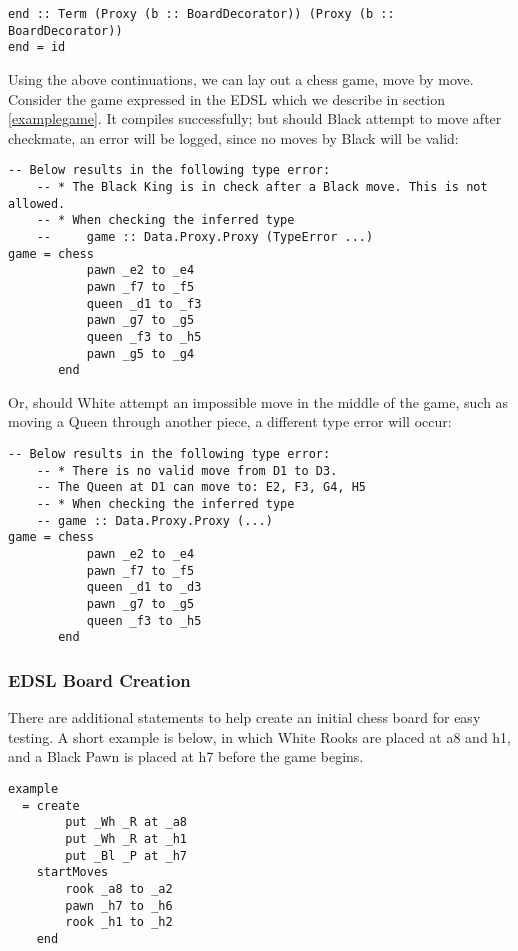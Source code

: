 \documentclass[12pt, a4paper, bibliography=totocnumbered]{scrartcl}
\begin{document}
\begin{lstlisting}
end :: Term (Proxy (b :: BoardDecorator)) (Proxy (b :: BoardDecorator))
end = id
\end{lstlisting}

Using the above continuations, we can lay out a chess game, move by move. Consider the game expressed in the EDSL which we describe in section \ref{examplegame}. It compiles successfully; but should Black attempt to move after checkmate, an error will be logged, since no moves by Black will be valid:

\begin{lstlisting}
-- Below results in the following type error:
    -- * The Black King is in check after a Black move. This is not allowed.
    -- * When checking the inferred type
    --     game :: Data.Proxy.Proxy (TypeError ...)
game = chess
           pawn _e2 to _e4
           pawn _f7 to _f5
           queen _d1 to _f3
           pawn _g7 to _g5
           queen _f3 to _h5
           pawn _g5 to _g4
       end
\end{lstlisting}

Or, should White attempt an impossible move in the middle of the game, such as moving a Queen through another piece, a different type error will occur:

\begin{lstlisting}
-- Below results in the following type error:
    -- * There is no valid move from D1 to D3.
    -- The Queen at D1 can move to: E2, F3, G4, H5
    -- * When checking the inferred type
    -- game :: Data.Proxy.Proxy (...)
game = chess
           pawn _e2 to _e4
           pawn _f7 to _f5
           queen _d1 to _d3
           pawn _g7 to _g5
           queen _f3 to _h5
       end
\end{lstlisting}

\subsubsection{EDSL Board Creation}

There are additional statements to help create an initial chess board for easy testing. A short example is below, in which White Rooks are placed at a8 and h1, and a Black Pawn is placed at h7 before the game begins.

\begin{lstlisting}
example
  = create                 
        put _Wh _R at _a8
        put _Wh _R at _h1
        put _Bl _P at _h7   
    startMoves           
        rook _a8 to _a2
        pawn _h7 to _h6
        rook _h1 to _h2
    end
\end{lstlisting}
\end{document}
